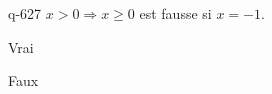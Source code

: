 \begin{truefalse}{q-627}
$x > 0 \Rightarrow x \geq 0$ est fausse si $x=-1$.
\item Vrai
\item* Faux
\end{truefalse}

